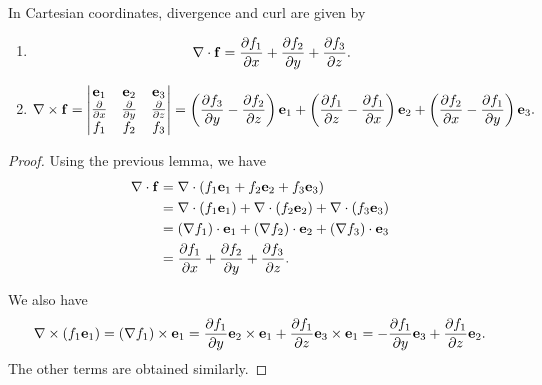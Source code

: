 \documentclass[10pt, a4paper]{article}
\begin{document}
\begin{proposition}
    In Cartesian coordinates,
    divergence and curl are given by
    \begin{enumerate}[label = (\roman*)]
        \item
        \[
        \mbf{\nabla} \cdot \mbf{f} = \pd[f_1]{x} + \pd[f_2]{y} + \pd[f_3]{z}.
        \]

        \item
        \[
        \mbf{\nabla} \times \mbf{f} = \begin{vmatrix}
            \mbf{e}_1 & \mbf{e}_2 & \mbf{e}_3 \\
            \pd{x} & \pd{y} & \pd{z} \\
            f_1 & f_2 & f_3
        \end{vmatrix}
        = \left(\pd[f_3]{y} - \pd[f_2]{z}\right)\mbf{e}_1 + \left(\pd[f_1]{z} - \pd[f_1]{x}\right)\mbf{e}_2 + \left(\pd[f_2]{x} - \pd[f_1]{y}\right)\mbf{e}_3.
        \]
    \end{enumerate}

    \begin{proof}
        Using the previous lemma,
        we have
        \begin{align*}
            \mbf{\nabla} \cdot \mbf{f} &= \mbf{\nabla} \cdot (f_1\mbf{e}_1 + f_2\mbf{e}_2 + f_3\mbf{e}_3) \\
            &= \mbf{\nabla} \cdot (f_1\mbf{e}_1) + \mbf{\nabla} \cdot (f_2\mbf{e}_2) + \mbf{\nabla} \cdot (f_3\mbf{e}_3) \\
            &= (\mbf{\nabla}f_1) \cdot \mbf{e}_1 + (\mbf{\nabla}f_2) \cdot \mbf{e}_2 + (\mbf{\nabla}f_3) \cdot \mbf{e}_3 \\
            &= \pd[f_1]{x} + \pd[f_2]{y} + \pd[f_3]{z}.
        \end{align*}

        We also have
        \[
        \mbf{\nabla} \times (f_1\mbf{e}_1) = (\mbf{\nabla}f_1) \times \mbf{e}_1 = \pd[f_1]{y}\mbf{e}_2 \times \mbf{e}_1 + \pd[f_1]{z}\mbf{e}_3 \times \mbf{e}_1 = -\pd[f_1]{y}\mbf{e}_3 + \pd[f_1]{z}\mbf{e}_2.
        \]
        The other terms are obtained similarly.
    \end{proof}
\end{proposition}
\end{document}
